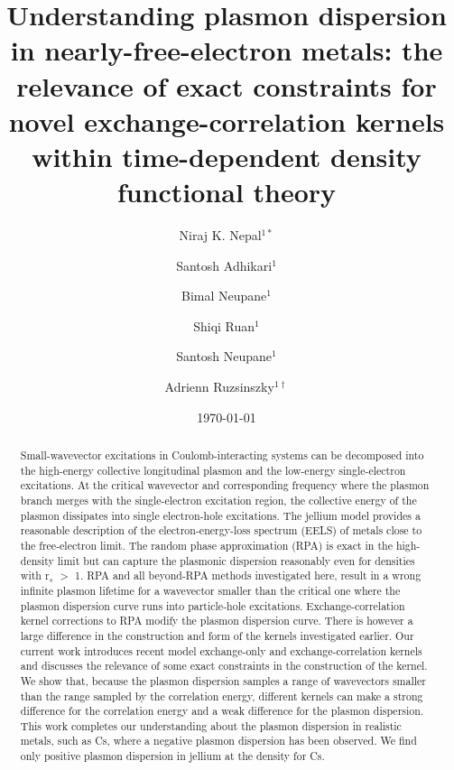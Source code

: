\documentclass[aps,amsmath,amssymb, preprint, 12pt]{revtex4-1}
\date{\today}
\begin{document}
\author{Niraj K. Nepal$^{1*}$}
\author{Santosh Adhikari$^1$}
\author{Bimal Neupane$^1$}
\author{Shiqi Ruan$^1$}
\author{Santosh Neupane$^1$}
\author{Adrienn Ruzsinszky$^{1\dagger}$}

\title{Understanding plasmon dispersion in nearly-free-electron metals: the relevance of exact constraints for novel exchange-correlation kernels within time-dependent density functional theory}
\begin{abstract}
 Small-wavevector excitations in Coulomb-interacting systems can be decomposed into the high-energy collective longitudinal plasmon and the low-energy single-electron excitations. At the critical wavevector and corresponding frequency where the plasmon branch merges with the single-electron excitation region, the collective energy of the plasmon dissipates into single electron-hole excitations. The jellium model provides a reasonable description of the electron-energy-loss spectrum (EELS) of metals close to the free-electron limit. The random phase approximation (RPA) is exact in the high-density limit but can capture the plasmonic dispersion reasonably even for densities with r$_s$ $>$ 1. RPA and all beyond-RPA methods investigated here, result in a wrong infinite plasmon lifetime for a wavevector smaller than the critical one where the plasmon dispersion curve runs into particle-hole excitations. Exchange-correlation kernel corrections to RPA modify the plasmon dispersion curve. There is however a large difference in the construction and form of the kernels investigated earlier. Our current work introduces recent model exchange-only and exchange-correlation kernels and discusses the relevance of some exact constraints in the construction of the kernel. We show that, because the plasmon dispersion samples a range of wavevectors smaller than the range sampled by the correlation energy, different kernels can make a strong difference for the correlation energy and a weak difference for the plasmon dispersion. This work completes our understanding about the plasmon dispersion in realistic metals, such as Cs, where a negative plasmon dispersion has been observed. We find only positive plasmon dispersion in jellium at the density for Cs. 
\end{abstract}
\maketitle
\end{document}
